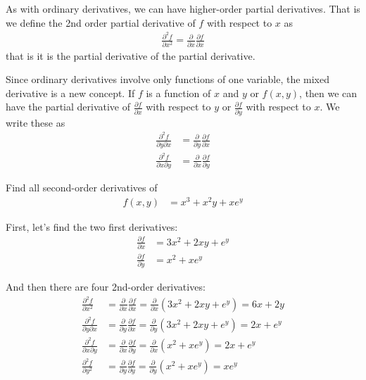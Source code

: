 As with ordinary derivatives, we can have higher-order partial derivatives.  That is we define the 2nd order partial derivative of $f$ with respect to $x$ as 
%
\begin{align*}
\frac{\partial^2 f}{\partial x^2} = \frac{\partial}{\partial x} \frac{\partial f}{\partial x}
\end{align*}
that is it is the partial derivative of the partial derivative.   

Since ordinary derivatives involve only functions of one variable, the mixed derivative is a new concept.  If $f$ is a function of $x$ and $y$ or $f(x,y)$, then we can have the partial derivative of $\frac{\partial f}{\partial x}$ with respect to $y$ or $\frac{\partial f}{\partial y}$ with respect to $x$.   We write these as
%
\begin{align*}
\frac{\partial^2 f}{\partial y \partial x} & = \frac{\partial}{\partial y} \frac{\partial f}{\partial x} \\
\frac{\partial^2 f}{\partial x \partial y} & = \frac{\partial}{\partial x} \frac{\partial f}{\partial y} 
\end{align*}


\begin{example}
Find all second-order derivatives of 
%
\begin{align*}
f(x,y) & = x^3 + x^2y + xe^y
\end{align*}

\solution

First, let's find the two first derivatives:
%
\begin{align*}
\frac{\partial f}{\partial x} & = 3x^2 + 2xy + e^y \\
\frac{\partial f}{\partial y} & = x^2 + xe^y
\end{align*}

And then there are four 2nd-order derivatives:
%
\begin{align*}
\frac{\partial^2 f}{\partial x^2} & = \frac{\partial}{\partial x} \frac{\partial f}{\partial x} = \frac{\partial}{\partial x} (3x^2 + 2xy + e^y) = 6x + 2y \\
\frac{\partial^2 f}{\partial y \partial x} & = \frac{\partial}{\partial y} \frac{\partial f}{\partial x} = \frac{\partial}{\partial y} (3x^2+2xy+e^y) = 2x + e^y \\
\frac{\partial^2 f}{\partial x \partial y} & = \frac{\partial}{\partial x} \frac{\partial f}{\partial y} = \frac{\partial}{\partial x} (x^2+xe^y) = 2x + e^y \\
\frac{\partial^2 f}{\partial y^2} & = \frac{\partial}{\partial y} \frac{\partial f}{\partial y} = \frac{\partial}{\partial y} (x^2+xe^y) = xe^y 
\end{align*}


\end{example}

